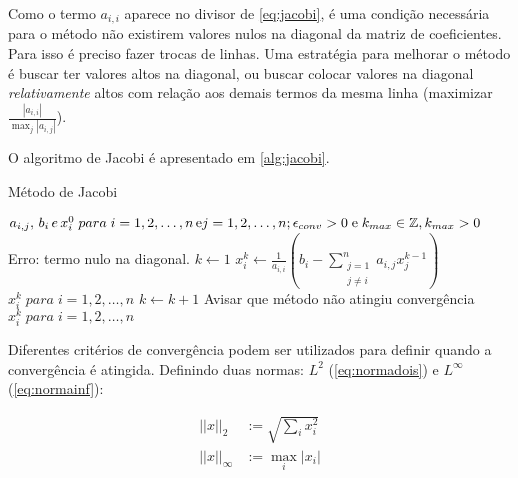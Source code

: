 \documentclass[final,5p]{elsarticle}
\numberwithin{equation}{section}
\begin{document}
        Como o termo $a_{i,i}$ aparece no divisor de \ref{eq:jacobi}, é uma condição necessária para o método não existirem valores nulos na diagonal da matriz de coeficientes. Para isso é preciso fazer trocas de linhas. Uma estratégia para melhorar o método é buscar ter valores altos na diagonal, ou buscar colocar valores na diagonal \emph{relativamente} altos com relação aos demais termos da mesma linha (maximizar $\frac{|a_{i,i}|}{\max_j |a_{i,j}|}$).

        O algoritmo de Jacobi é apresentado em \ref{alg:jacobi}.

        \begin{algorithm}
            \caption{Método de Jacobi}\label{alg:jacobi}
            \begin{algorithmic}
                \Require $a_{i,j},\,b_i\,e\, x_i^0\; para \; i=1,2,\ldots,n\,\text{e}\\j=1,2,\ldots,n;\\\epsilon_{conv} > 0\;\text{e}\; k_{max} \in \mathbb{Z}, k_{max} > 0$
                        \State \Return Erro: termo nulo na diagonal.
                    \EndIf
                \EndFor
                \State $k \gets 1$
                        \State $x_i^k \gets \frac{1}{a_{i,i}} ( b_i - \sum^{n}_{\substack{j=1 \\ j \neq i}} a_{i,j} x_j^{k-1} )$
                    \EndFor
                        \State \Return $x_i^k \; para \; i=1,2,\ldots,n$
                    \EndIf
                    \State $k \gets k+1$
                \EndWhile
                \State Avisar que método não atingiu convergência
                \State \Return $x_i^k \; para \; i=1,2,\ldots,n$
            \end{algorithmic}
        \end{algorithm}

        Diferentes critérios de convergência podem ser utilizados para definir quando a convergência é atingida. Definindo duas normas: $L^2$ (\ref{eq:normadois}) e $L^\infty$ (\ref{eq:normainf}):

        \begin{align}
            ||x||_2 &:= \sqrt{\sum_{i}x_i^2} \label{eq:normadois} \\
            ||x||_\infty &:= \max_{i} |x_i| \label{eq:normainf}
        \end{align}
\end{document}

